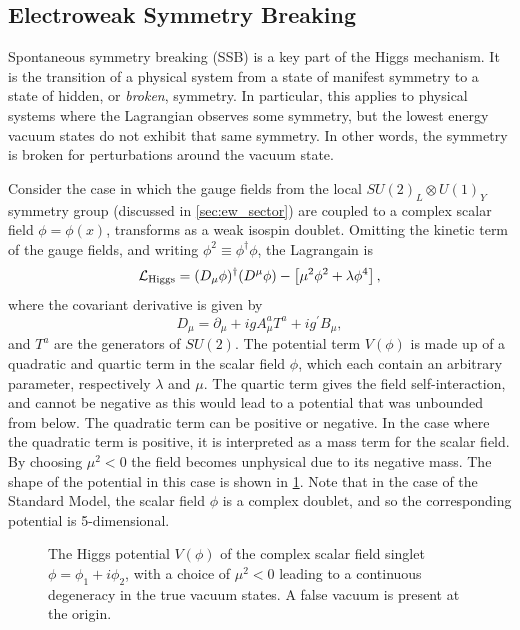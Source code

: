 \subsection{Electroweak Symmetry Breaking}\label{sec:sm_ewsb}

Spontaneous symmetry breaking (SSB) is a key part of the Higgs mechanism. It is the transition of a physical system from a state of manifest symmetry to a state of hidden, or \textit{broken}, symmetry. In particular, this applies to physical systems where the Lagrangian observes some symmetry, but the lowest energy vacuum states do not exhibit that same symmetry. In other words, the symmetry is broken for perturbations around the vacuum state.

Consider the case in which the gauge fields from the local $SU(2)_L \otimes U(1)_Y$ symmetry group (discussed in \cref{sec:ew_sector}) are coupled to a complex scalar field $\phi = \phi(x)$, transforms as a weak isospin doublet.
Omitting the kinetic term of the gauge fields, and writing $\phi^2 \equiv \phi^\dagger \phi$, the Lagrangain is
%
\begin{equation}\label{eq:sm_higgs_lagrangian}
  \mathcal{L}_{\textnormal{Higgs}} = 
  (D_\mu \phi)^\dagger (D^\mu \phi) - \left[ \mu^2 \phi^2 + \lambda \phi^4 \right],
\end{equation}
%
where the covariant derivative is given by
%
\begin{equation}\label{eq:sm_higgs_cov_derivative}
  D_\mu = \partial_\mu + i g A^a_\mu T^a + i g^\prime B_\mu ,
\end{equation}
%
and $T^a$ are the generators of $SU(2)$.
The potential term $V(\phi)$ is made up of a quadratic and quartic term in the scalar field $\phi$, which each contain an arbitrary parameter, respectively $\lambda$ and $\mu$.
The quartic term gives the field self-interaction, and cannot be negative as this would lead to a potential that was unbounded from below.
The quadratic term can be positive or negative.
In the case where the quadratic term is positive, it is interpreted as a mass term for the scalar field.
By choosing $\mu^2 < 0$ the field becomes unphysical due to its negative mass.
The shape of the potential in this case is shown in \cref{fig:higgs_potential}.
Note that in the case of the Standard Model, the scalar field $\phi$ is a complex doublet, and so the corresponding potential is 5-dimensional.
%
\begin{figure}[!htbp]
  \centering
  
  \caption{
    The Higgs potential $V(\phi)$ of the complex scalar field singlet $\phi = \phi_1 + i \phi_2$, with a choice of $\mu^2 < 0$ leading to a continuous degeneracy in the true vacuum states. A false vacuum is present at the origin.
  }
  \label{fig:higgs_potential}
\end{figure}
